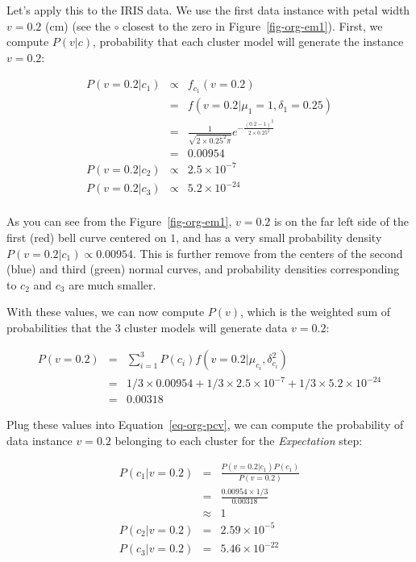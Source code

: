 \documentclass[
  letterpaper,
]{scrbook}
\begin{document}
Let's apply this to the IRIS data. We use the first data instance with
petal width \(v=0.2\) (cm) (see the \(\circ\) closest to the zero in
Figure~\ref{fig-org-em1}). First, we compute \(P(v|c)\), probability
that each cluster model will generate the instance \(v=0.2\):

\[\begin{aligned}
  P(v=0.2|c_1)
  & \propto & f_{c_1}(v=0.2) \\
  & = & f(v=0.2|\mu_1=1,\delta_1=0.25) \\
  & = & \frac{1}{\sqrt{2\times0.25^2 \pi}} e^{-\frac{(0.2-1)^2}{2\times0.25^2}} \\
  & = & 0.00954 \\
  P(v=0.2|c_2) & \propto &  2.5 \times 10^{-7} \\
  P(v=0.2|c_3) & \propto &  5.2 \times 10^{-24} \\
\end{aligned}\]

As you can see from the Figure~\ref{fig-org-em1}, \(v=0.2\) is on the
far left side of the first (red) bell curve centered on \(1\), and has a
very small probability density \(P(v=0.2|c_1) \propto 0.00954\). This is
further remove from the centers of the second (blue) and third (green)
normal curves, and probability densities corresponding to \(c_2\) and
\(c_3\) are much smaller.

With these values, we can now compute \(P(v)\), which is the weighted
sum of probabilities that the \(3\) cluster models will generate data
\(v=0.2\):

\[\begin{aligned}
  P(v=0.2)
  & = & \sum_{i=1}^{3} P(c_i) f(v=0.2|\mu_{c_i},\delta_{c_i}^2) \\
  & = & 1/3 \times 0.00954 + 1/3 \times 2.5 \times 10^{-7} + 1/3 \times 5.2 \times 10^{-24} \\
  & = & 0.00318
\end{aligned}\]

Plug these values into Equation~\hyperref[eq-org-pcv]{{[}eq-org-pcv{]}},
we can compute the probability of data instance \(v=0.2\) belonging to
each cluster for the \emph{Expectation} step:

\[\begin{aligned}
  P(c_1|v=0.2)
  & = & \frac{P(v=0.2|c_1) P(c_1)}{P(v=0.2)} \\
  & = & \frac{0.00954 \times 1/3}{0.00318} \\
  & \approx & 1 \\
  P(c_2|v=0.2) & = & 2.59 \times 10^{-5} \\
  P(c_3|v=0.2) & = & 5.46 \times 10^{-22}
\end{aligned}\]
\end{document}
